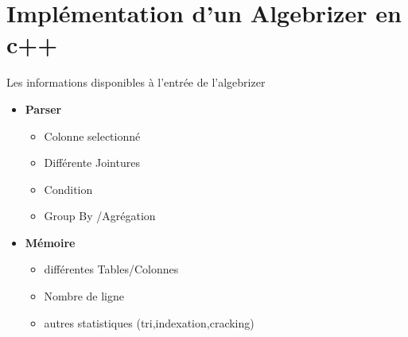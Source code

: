 \documentclass[aspectratio=43,12pt]{beamer}
\begin{document}
\section{Implémentation d'un Algebrizer en c++}
\begin{frame}{Les informations disponibles à l'entrée de l'algebrizer}
    \begin{itemize}
        \item \textbf{Parser}
              \begin{itemize}
                  \item Colonne selectionné
                  \item Différente Jointures
                  \item Condition
                  \item Group By /Agrégation
              \end{itemize}
        \item \textbf{Mémoire}
              \begin{itemize}
                  \item différentes Tables/Colonnes
                  \item Nombre de ligne
                  \item autres statistiques (tri,indexation,cracking)
              \end{itemize}
    \end{itemize}
\end{frame}
\end{document}
